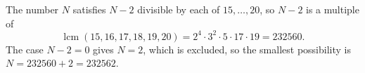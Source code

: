 The number $N$ satisfies $N-2$ divisible by each of $15,\dots,20$, so $N-2$ is a multiple of
\[
\operatorname{lcm}(15,16,17,18,19,20)=2^4\cdot3^2\cdot5\cdot17\cdot19=232560 .
\]
The case $N-2=0$ gives $N=2$, which is excluded, so the smallest possibility is $N=232560+2=\boxed{232562}$.
